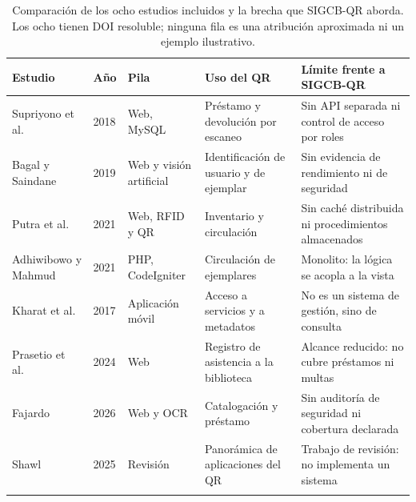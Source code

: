 \documentclass[11pt,a4paper]{article}
\begin{document}
\begin{longtable}{@{}p{3.1cm}p{0.9cm}p{2.4cm}p{2.9cm}p{4.3cm}@{}}
\toprule
\textbf{Estudio} & \textbf{Año} & \textbf{Pila} & \textbf{Uso del QR} & \textbf{Límite frente a SIGCB-QR} \\
\midrule
\endhead
Supriyono et al.~\cite{supriyono2018qrlibrary} & 2018 & Web, MySQL & Préstamo y devolución por escaneo & Sin API separada ni control de acceso por roles \\
Bagal y Saindane~\cite{bagal2019librany} & 2019 & Web y visión artificial & Identificación de usuario y de ejemplar & Sin evidencia de rendimiento ni de seguridad \\
Putra et al.~\cite{putra2021rfidqr} & 2021 & Web, RFID y QR & Inventario y circulación & Sin caché distribuida ni procedimientos almacenados \\
Adhiwibowo y Mahmud~\cite{adhiwibowo2021perpustakaan} & 2021 & PHP, CodeIgniter & Circulación de ejemplares & Monolito: la lógica se acopla a la vista \\
Kharat et al.~\cite{kharat2017qrlayar} & 2017 & Aplicación móvil & Acceso a servicios y a metadatos & No es un sistema de gestión, sino de consulta \\
Prasetio et al.~\cite{prasetio2024wastukancana} & 2024 & Web & Registro de asistencia a la biblioteca & Alcance reducido: no cubre préstamos ni multas \\
Fajardo~\cite{fajardo2026smartlibrary} & 2026 & Web y OCR & Catalogación y préstamo & Sin auditoría de seguridad ni cobertura declarada \\
Shawl~\cite{shawl2025qrservices} & 2025 & Revisión & Panorámica de aplicaciones del QR & Trabajo de revisión: no implementa un sistema \\
\bottomrule
\caption{Comparación de los ocho estudios incluidos y la brecha que SIGCB-QR
aborda. Los ocho tienen DOI resoluble; ninguna fila es una atribución
aproximada ni un ejemplo ilustrativo.}
\label{tab:relacionados}
\end{longtable}
\end{document}
